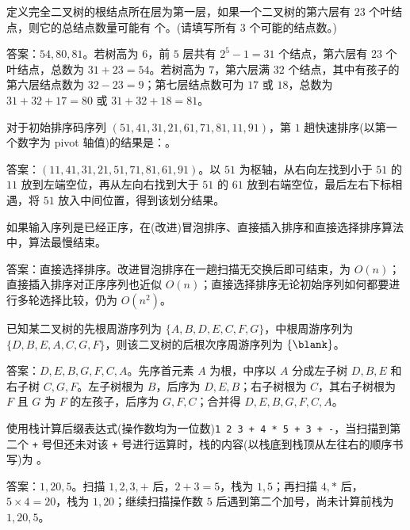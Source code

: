 \begin{question}
定义完全二叉树的根结点所在层为第一层，如果一个二叉树的第六层有 $23$ 个叶结点，则它的总结点数量可能有 \blank 个。(请填写所有 $3$ 个可能的结点数。)
\begin{solution}
答案：$54,80,81$。若树高为 $6$，前 $5$ 层共有 $2^5-1=31$ 个结点，第六层有 $23$ 个叶结点，总数为 $31+23=54$。若树高为 $7$，第六层满 $32$ 个结点，其中有孩子的第六层结点数为 $32-23=9$；第七层结点数可为 $17$ 或 $18$，总数为 $31+32+17=80$ 或 $31+32+18=81$。
\end{solution}
\end{question}

\begin{question}
对于初始排序码序列 $(51,41,31,21,61,71,81,11,91)$，第 $1$ 趟快速排序(以第一个数字为 pivot 轴值)的结果是：\blank。
\begin{solution}
答案：$(11,41,31,21,51,71,81,61,91)$。以 $51$ 为枢轴，从右向左找到小于 $51$ 的 $11$ 放到左端空位，再从左向右找到大于 $51$ 的 $61$ 放到右端空位，最后左右下标相遇，将 $51$ 放入中间位置，得到该划分结果。
\end{solution}
\end{question}

\begin{question}
如果输入序列是已经正序，在(改进)冒泡排序、直接插入排序和直接选择排序算法中，\blank 算法最慢结束。
\begin{solution}
答案：直接选择排序。改进冒泡排序在一趟扫描无交换后即可结束，为 $O(n)$；直接插入排序对正序序列也近似 $O(n)$；直接选择排序无论初始序列如何都要进行多轮选择比较，仍为 $O(n^2)$。
\end{solution}
\end{question}

\begin{question}
已知某二叉树的先根周游序列为 $\{A,B,D,E,C,F,G\}$，中根周游序列为 $\{D,B,E,A,C,G,F\}$，则该二叉树的后根次序周游序列为 $\{\blank\}$。
\begin{solution}
答案：$D,E,B,G,F,C,A$。先序首元素 $A$ 为根，中序以 $A$ 分成左子树 $D,B,E$ 和右子树 $C,G,F$。左子树根为 $B$，后序为 $D,E,B$；右子树根为 $C$，其右子树根为 $F$ 且 $G$ 为 $F$ 的左孩子，后序为 $G,F,C$；合并得 $D,E,B,G,F,C,A$。
\end{solution}
\end{question}

\begin{question}
使用栈计算后缀表达式(操作数均为一位数)\texttt{1 2 3 + 4 * 5 + 3 + -}，当扫描到第二个 \texttt{+} 号但还未对该 \texttt{+} 号进行运算时，栈的内容(以栈底到栈顶从左往右的顺序书写)为 \blank。
\begin{solution}
答案：$1,20,5$。扫描 $1,2,3,+$ 后，$2+3=5$，栈为 $1,5$；再扫描 $4,*$ 后，$5\times4=20$，栈为 $1,20$；继续扫描操作数 $5$ 后遇到第二个加号，尚未计算前栈为 $1,20,5$。
\end{solution}
\end{question}


